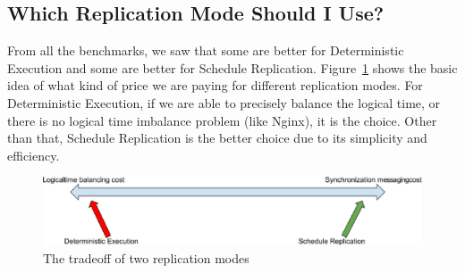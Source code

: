 \subsection{Which Replication Mode Should I Use?}
From all the benchmarks, we saw that some are better for Deterministic Execution and some are better for Schedule Replication. Figure~\ref{f:trade_off} shows the basic idea of what kind of price we are paying for different replication modes. For Deterministic Execution, if we are able to precisely balance the logical time, or there is no logical time imbalance problem (like Nginx), it is the choice. Other than that, Schedule Replication is the better choice due to its simplicity and efficiency.

\begin{figure}
\centering
\includegraphics[width=1\columnwidth]{figures/tradeoff}
\caption{The tradeoff of two replication modes}
\label{f:trade_off}
\end{figure}